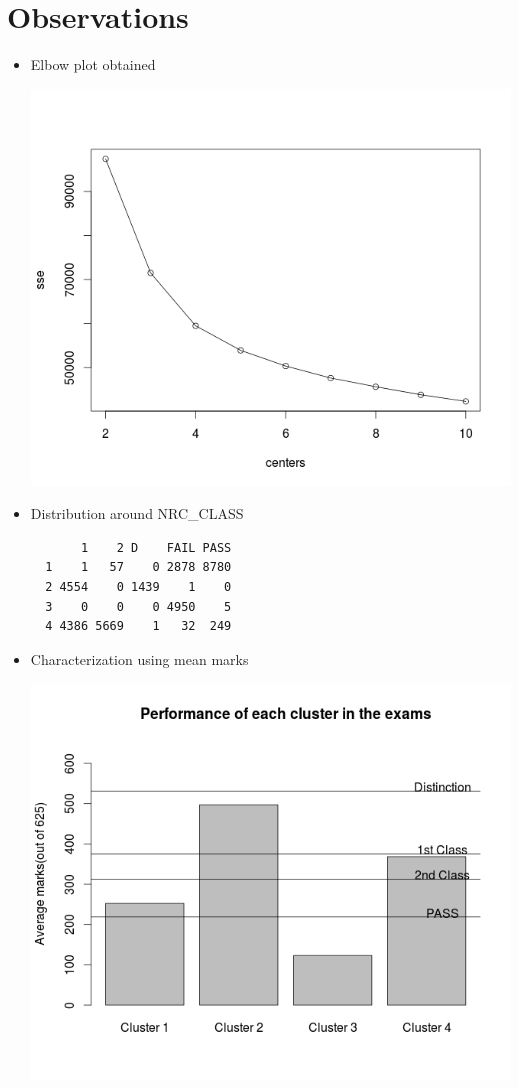 \section*{Observations}
\begin{itemize}
\item Elbow plot obtained

\includegraphics[scale=0.5]{img/kmeans_elbow.png}


\item Distribution around NRC{\_}CLASS
\begin{lstlisting}
       1    2 D    FAIL PASS
  1    1   57    0 2878 8780
  2 4554    0 1439    1    0
  3    0    0    0 4950    5
  4 4386 5669    1   32  249
\end{lstlisting}

\item Characterization using mean marks

\includegraphics[scale=0.5]{img/barplot_mean_marks.png}



\end{itemize}
